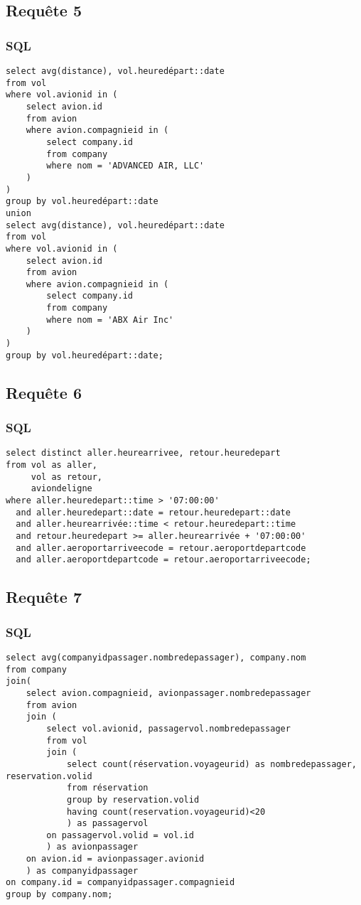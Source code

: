 \documentclass[french, utf8]{article}
\begin{document}
\subsection{Requête 5}
\subsubsection{SQL}
\begin{verbatim}
select avg(distance), vol.heuredépart::date
from vol
where vol.avionid in (
    select avion.id
    from avion
    where avion.compagnieid in (
        select company.id
        from company
        where nom = 'ADVANCED AIR, LLC'
    )
)
group by vol.heuredépart::date
union
select avg(distance), vol.heuredépart::date
from vol
where vol.avionid in (
    select avion.id
    from avion
    where avion.compagnieid in (
        select company.id
        from company
        where nom = 'ABX Air Inc'
    )
)
group by vol.heuredépart::date;
\end{verbatim}
\newpage


\subsection{Requête 6}
\subsubsection{SQL}
\begin{verbatim}
select distinct aller.heurearrivee, retour.heuredepart
from vol as aller,
     vol as retour,
     aviondeligne
where aller.heuredepart::time > '07:00:00'
  and aller.heuredepart::date = retour.heuredepart::date
  and aller.heurearrivée::time < retour.heuredepart::time
  and retour.heuredepart >= aller.heurearrivée + '07:00:00'
  and aller.aeroportarriveecode = retour.aeroportdepartcode
  and aller.aeroportdepartcode = retour.aeroportarriveecode;
\end{verbatim}
\newpage

\subsection{Requête 7}
\subsubsection{SQL}
\begin{verbatim}
select avg(companyidpassager.nombredepassager), company.nom
from company
join(
    select avion.compagnieid, avionpassager.nombredepassager
    from avion
    join (
        select vol.avionid, passagervol.nombredepassager
        from vol
        join (
            select count(réservation.voyageurid) as nombredepassager, reservation.volid
            from réservation
            group by reservation.volid
            having count(reservation.voyageurid)<20
            ) as passagervol
        on passagervol.volid = vol.id
        ) as avionpassager
    on avion.id = avionpassager.avionid
    ) as companyidpassager
on company.id = companyidpassager.compagnieid
group by company.nom;
\end{verbatim}
\newpage
\end{document}
